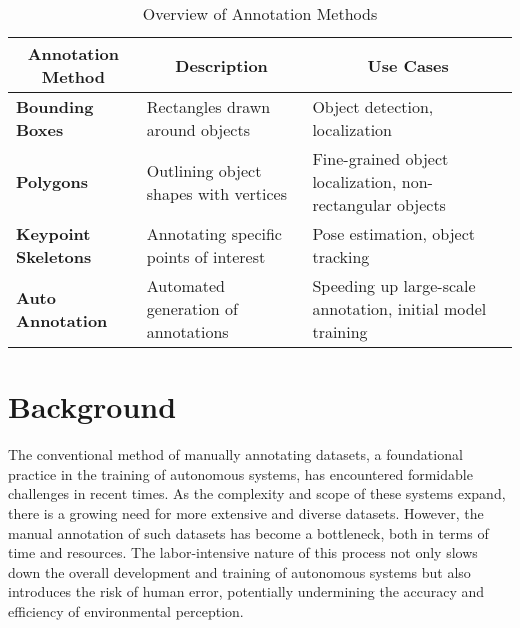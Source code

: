 \begin{table}[htbp!]
  \centering
  \begin{tabular}{|p{3.5cm}|p{5cm}|p{6cm}|}
    \hline
    \multicolumn{1}{|c|}{\textbf{Annotation Method}} & \multicolumn{1}{c|}{\textbf{Description}} & \multicolumn{1}{c|}{\textbf{Use Cases}} \\
    \hline
    \centering\textbf{Bounding Boxes} & Rectangles drawn around objects & Object detection, localization \\
    \hline
    \centering\textbf{Polygons} & Outlining object shapes with vertices & Fine-grained object localization, non-rectangular objects \\
    \hline
    \centering\textbf{Keypoint \mbox{Skeletons}} & Annotating specific points of interest & Pose estimation, object tracking \\
    \hline
    \centering\textbf{Auto \mbox{Annotation}} & Automated generation of annotations & Speeding up large-scale annotation, initial model training \\
    \hline
  \end{tabular}
  \caption{Overview of Annotation Methods}
\end{table}

\setlength{\parskip}{2ex}

\clearpage

\section{Background}

The conventional method of manually annotating datasets, a foundational practice in the training of autonomous systems, has encountered formidable challenges in recent times. As the complexity and scope of these systems expand, there is a growing need for more extensive and diverse datasets. However, the manual annotation of such datasets has become a bottleneck, both in terms of time and resources. The labor-intensive nature of this process not only slows down the overall development and training of autonomous systems but also introduces the risk of human error, potentially undermining the accuracy and efficiency of environmental perception.

